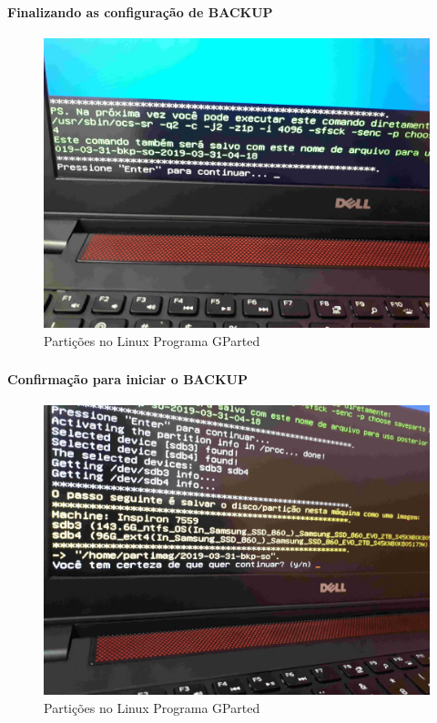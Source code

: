 \documentclass{beamer}
\begin{document}
\begin{frame}[plain,c]
   \frametitle{\insertsection}
    \framesubtitle{Finalizando as configuração de BACKUP}
    \begin{figure}[!h]
        \includegraphics[width=1\linewidth]{images/backup/bkp24.jpg}
        \caption{Partições no Linux Programa GParted}
    \end{figure}
\end{frame}	

\begin{frame}[plain,c]
   \frametitle{\insertsection}
    \framesubtitle{Confirmação para iniciar o BACKUP}
    \begin{figure}[!h]
        \includegraphics[width=1\linewidth]{images/backup/bkp25.jpg}
        \caption{Partições no Linux Programa GParted}
    \end{figure}
\end{frame}	
\end{document}
